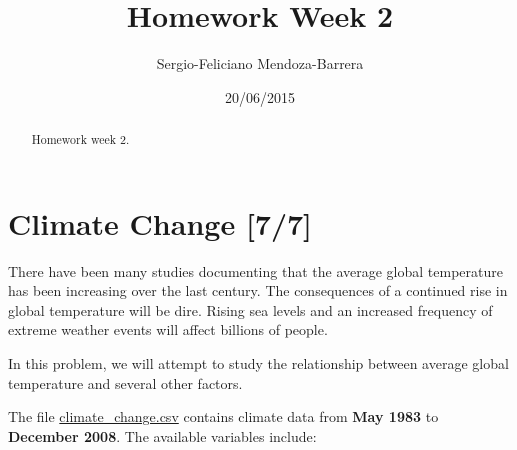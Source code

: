 \documentclass[letterpaper, 9pt, onecolumn, twoside, technote, final]{IEEEtran}
\author{Sergio-Feliciano Mendoza-Barrera}
\date{20/06/2015}
\title{Homework Week 2}
\begin{document}
\maketitle

\begin{abstract}
Homework week 2.
\end{abstract}

\section{Climate Change [7/7]}
\label{sec-1}

There have been many studies documenting that the average global
temperature has been increasing over the last century. The
consequences of a continued rise in global temperature will be
dire. Rising sea levels and an increased frequency of extreme weather
events will affect billions of people.

In this problem, we will attempt to study the relationship between
average global temperature and several other factors.

The file \href{https://courses.edx.org/asset-v1:MITx\%2B15.071x_2a\%2B2T2015\%2Btype@asset\%2Bblock/climate_change.csv}{climate\_change.csv} contains climate data from \textbf{May 1983} to
\textbf{December 2008}. The available variables include:
\end{document}
